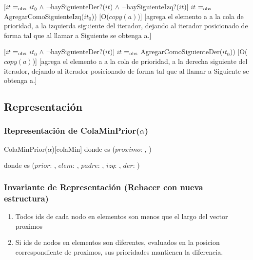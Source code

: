 	[$it$ $=_{\mathrm{obs}}$ $it_0$ $\wedge$ $\neg$haySiguienteDer?($it$) $\wedge$ $\neg$haySiguienteIzq?($it$)]
	{$it$ $=_{\mathrm{obs}}$ AgregarComoSiguienteIzq($it_0$))}
	[O($copy(a)$)]
	[agrega el elemento a a la cola de prioridad, a la izquierda siguiente del iterador, dejando
al iterador posicionado de forma tal que al llamar a Siguiente se obtenga a.]

	[$it$ $=_{\mathrm{obs}}$ $it_0$ $\wedge$ $\neg$haySiguienteDer?($it$)]
	{$it$ $=_{\mathrm{obs}}$ AgregarComoSiguienteDer($it_0$))}
	[O($copy(a)$)]
	[agrega el elemento a a la cola de prioridad, a la derecha siguiente del iterador, dejando
al iterador posicionado de forma tal que al llamar a Siguiente se obtenga a.]

\subsection{Representación}

	\subsubsection{Representación de ColaMinPrior($\alpha$)}

		\begin{Estructura}{ColaMinPrior($\alpha$)}[colaMin]
			\- \- \- \- donde  es ($proximo$: ,
			)
			
			\- \- \- \- donde  es ($prior$: , $elem$: \TipoVariable{$\alpha$}, $padre$: , $izq$: , $der$: )
			
		\end{Estructura}

	\subsubsection{Invariante de Representación (Rehacer con nueva estructura)}

		\renewcommand{\labelenumi}{(\Roman{enumi})}

		\begin{enumerate}
			\item Todos ids de cada nodo en elementos son menos que el largo del vector proximos 
			\item Si ids de nodos en elementos son diferentes, evaluados en la posicion correspondiente de proximos, sus prioridades mantienen la diferencia.  
		\end{enumerate}


